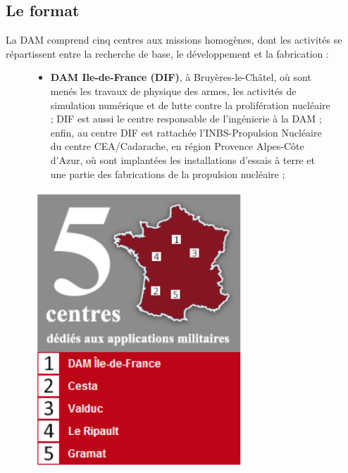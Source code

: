 \documentclass[12pt,a4paper,twoside]{article}
\begin{document}
\subsection*{Le format}
La DAM comprend cinq centres aux missions homogènes, dont les activités se
répartissent entre la recherche de base, le développement et la fabrication :
\begin{figure}[!ht]
	\begin{minipage}{0.6\linewidth}
		\begin{itemize}[label=\textbullet]
			\item
				{\bf DAM Ile-de-France (DIF)}, à Bruyères-le-Châtel, où sont
				menés les travaux de physique des armes, les activités de
				simulation numérique et de lutte contre la prolifération
				nucléaire ; DIF est aussi le centre responsable de l'ingénierie
				à la DAM ; enfin, au centre DIF est rattachée l'INBS-Propulsion
				Nucléaire du centre CEA/Cadarache, en région Provence Alpes-Côte
				d'Azur, où sont implantées les installations d'essais à terre et
				une partie des fabrications de la propulsion nucléaire ;
		\end{itemize}
	\end{minipage}
	\begin{minipage}{0.4\linewidth}
		\centering
		\includegraphics[width=0.7\textwidth]{ressources/images/dam/5_centres.png}
	\end{minipage}
\end{figure}
\end{document}
